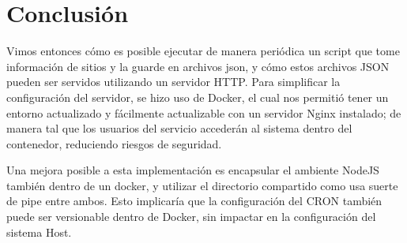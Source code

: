 \documentclass[12pt]{article}
\begin{document}
\section{Conclusión}

Vimos entonces cómo es posible ejecutar de manera periódica un script que tome información de sitios y la guarde en archivos json, y cómo estos archivos JSON pueden ser servidos utilizando un servidor HTTP. Para simplificar la configuración del servidor, se hizo uso de Docker, el cual nos permitió tener un entorno actualizado y fácilmente actualizable con un servidor Nginx instalado; de manera tal que los usuarios del servicio accederán al sistema dentro del contenedor, reduciendo riesgos de seguridad.

Una mejora posible a esta implementación es encapsular el ambiente NodeJS también dentro de un docker, y utilizar el directorio compartido como usa suerte de pipe entre ambos. Esto implicaría que la configuración del CRON también puede ser versionable dentro de Docker, sin impactar en la configuración del sistema Host.

\clearpage
\end{document}
